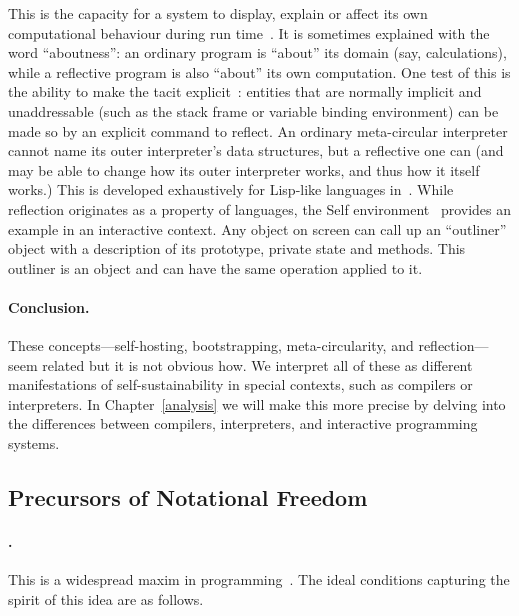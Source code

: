 This is the capacity for a system to display, explain or affect its own
computational behaviour during run time~\cite{CompRefl}. It is sometimes
explained with the word ``aboutness'': an ordinary program is ``about''
its domain (say, calculations), while a reflective program is also
``about'' its own computation. One test of this is the ability to make
the tacit explicit~\cite{ProcRefl}: entities that are normally implicit
and unaddressable (such as the stack frame or variable binding
environment) can be made so by an explicit command to reflect. An
ordinary meta-circular interpreter cannot name its outer interpreter's
data structures, but a reflective one can (and may be able to change how
its outer interpreter works, and thus how it itself works.) This is
developed exhaustively for Lisp-like languages in~\cite{ProcRefl}. While
reflection originates as a property of languages, the Self
environment~\cite{Self} provides an example in an interactive context.
Any object on screen can call up an ``outliner'' object with a
description of its prototype, private state and methods. This outliner
is an object and can have the same operation applied to it.

\paragraph{Conclusion.}

These concepts---self-hosting, bootstrapping, meta-circularity, and
reflection---seem related but it is not obvious how. We interpret all of
these as different manifestations of self-sustainability in special
contexts, such as compilers or interpreters. In Chapter~\ref{analysis}
we will make this more precise by delving into the differences between
compilers, interpreters, and interactive programming systems.

\hypertarget{precursors-of-notational-freedom}{%
\subsection{Precursors of Notational
Freedom}\label{precursors-of-notational-freedom}}

\paragraph{\URTFJ.}

This is a widespread maxim in programming~\cite{RightTool}. The ideal
conditions capturing the spirit of this idea are as follows.

